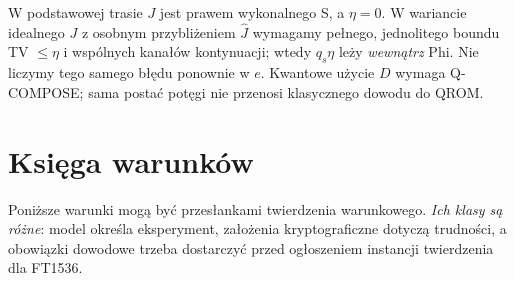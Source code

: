 \documentclass[11pt,a4paper]{article}
\begin{document}
W podstawowej trasie $J$ jest prawem wykonalnego S, a $\eta=0$.
W wariancie idealnego $J$ z osobnym przybliżeniem $\widehat J$ wymagamy
pełnego, jednolitego boundu TV $\le\eta$ i wspólnych kanałów kontynuacji;
wtedy $q_s\eta$ leży \emph{wewnątrz} Phi. Nie liczymy tego samego błędu
ponownie w $e$. Kwantowe użycie $D$ wymaga Q-COMPOSE; sama postać potęgi
nie przenosi klasycznego dowodu do QROM.

\section{Księga warunków}
Poniższe warunki mogą być przesłankami twierdzenia warunkowego.
\emph{Ich klasy są różne}: model określa eksperyment, założenia
kryptograficzne dotyczą trudności, a obowiązki dowodowe trzeba dostarczyć
przed ogłoszeniem instancji twierdzenia dla FT1536.
\small
\end{document}
